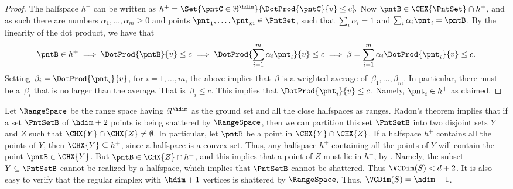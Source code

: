 \begin{proof}
    The halfspace $h^+$ can be written as
    \begin{math}
        h^+ = \Set{ \pntC \in \Re^\hdim }{\! \DotProd{\pntC }{v} \leq
           c}\!.
    \end{math}
     Now $\pntB \in \CHX{\PntSet} \cap h^+$, and as such
    there are numbers $\alpha_1, \ldots, \alpha_m \geq 0$ and points
    $\pnt_1,\ldots, \pnt_m \in \PntSet$, such that
    $\sum_i \alpha_i = 1$ and $\sum_i \alpha_i \pnt_i =\pntB$. By the
    linearity of the dot product, we have that
    \begin{equation*}
        \pntB \in h^+ %
        \implies%
        \DotProd{\pntB }{v} \leq c%
        \implies%
        \DotProd{\Bigl.\smash{\sum_{i=1}^m \alpha_i \pnt_i }}{v} \leq c%
        \implies%
        \beta = \sum_{i=1}^m \alpha_i\DotProd{ \pnt_i }{v} \leq c.        
    \end{equation*}
    Setting $\,\beta_i = \DotProd{ \pnt_i }{v}$, for $i=1,\ldots, m$,
    the above implies that $\,\beta$ is a weighted average of
    $\,\beta_1, \ldots, \beta_m$. In particular, there must be a
    $\,\beta_i$ that is no larger than the average. That is
    $\,\beta_i \leq c$. This implies that
    $\DotProd{ \pnt_i }{v} \leq c$. Namely, $\pnt_i \in h^+$ as
    claimed.
\end{proof}


Let $\RangeSpace$ be the range space having $\Re^\hdim$ as the ground
set and all the close halfspaces as ranges.  Radon's theorem implies
that if a set $\PntSetB$ of $\hdim + 2$ points is being shattered by
$\RangeSpace$, then we can partition this set $\PntSetB$ into two
disjoint sets $Y$ and $Z$ such that $\CHX{Y} \cap \CHX{Z} \ne
\emptyset$. In particular, let $\pntB$ be a point in $\CHX{Y} \cap
\CHX{Z}$.  If a halfspace $h^+$ contains all the points of $Y$, then
$\CHX{Y} \subseteq h^+$, since a halfspace is a convex set.  Thus, any
halfspace $h^+$ containing all the points of $Y$ will contain the
point $\pntB \in \CHX{Y}$. But $\pntB \in \CHX{Z} \cap h^+$, and this
implies that a point of $Z$ must lie in $h^+$, by
.  Namely, the subset $Y \subseteq
\PntSetB$ cannot be realized by a halfspace, which implies that
$\PntSetB$ cannot be shattered. Thus $\VCDim(S) < d+2$. It is also
easy to verify that the regular simplex with $\hdim+1$ vertices is
shattered by $\RangeSpace$. Thus, $\VCDim(S) = \hdim+1$.



